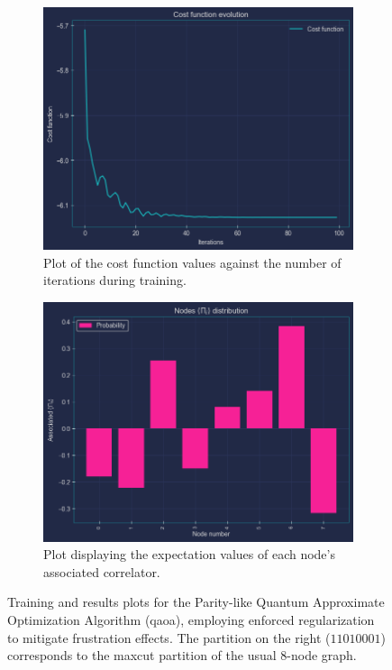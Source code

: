 \begin{figure}[ht!]
    \centering
    \begin{subfigure}[t]{0.495\textwidth}
        \centering
        \includegraphics[width=1\textwidth,height=0.75\textwidth]{Figures/Chapter_6/Parity QAOA + Restrictions/Parity+Restriction_Training.png}
        \caption{Plot of the cost function values against the number of iterations during training.}
        \label{fig:Parity+Restriction_Training}
    \end{subfigure}
    \hfill
    \begin{subfigure}[t]{0.495\textwidth}
        \centering
        \includegraphics[width=1\textwidth,height=0.75\textwidth]{Figures/Chapter_6/Parity QAOA + Restrictions/Parity+Restriction_Results.png}
        \caption{Plot displaying the expectation values of each node's associated correlator.}
        \label{fig:Parity+Restriction_Results}
    \end{subfigure}
    \caption{Training and results plots for the Parity-like Quantum Approximate Optimization Algorithm (\acrshort{qaoa}), employing enforced regularization to mitigate frustration effects. The partition on the right ($11010001$) corresponds to the \acrshort{maxcut} partition of the usual $8$-node graph.}
    \label{fig:Parity+Restriction}
\end{figure}

